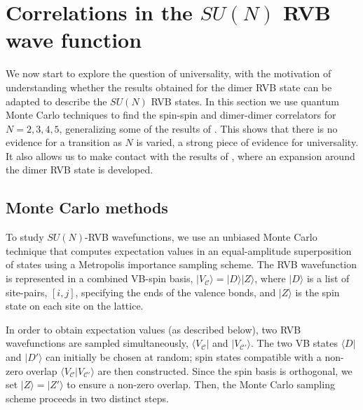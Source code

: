 \documentclass[11pt]{iopart}
\begin{document}
\section{Correlations in the $SU(N)$ RVB wave function}
\label{sec:correlations}
We now start to explore the question of universality, with the motivation of understanding whether the results obtained for the dimer RVB state can be adapted to describe the $SU(N)$ RVB states. In this section we use quantum Monte Carlo techniques to find the spin-spin and dimer-dimer correlators for $N=2,3,4,5$, generalizing some of the results of \cite{RVB1,RVB2}. This shows that there is no evidence for a transition as $N$ is varied, a strong piece of evidence for universality. It also allows us to make contact with the results of \cite{Damle}, where an expansion around the dimer RVB state is developed.


\subsection{Monte Carlo methods}
\label{sec:numerics}


To study $SU(N)$-RVB wavefunctions, we use an unbiased Monte Carlo technique that computes expectation values in an equal-amplitude superposition of states using a Metropolis importance sampling scheme.  The RVB wavefunction is represented in a combined VB-spin basis, $|V_{\mathcal C} \rangle = |D \rangle |Z \rangle$, where $| D \rangle$ is a list of site-pairs, $[i,j]$, specifying the ends of the valence bonds, and $|Z \rangle$ is the spin state on each site on the lattice.

In order to obtain expectation values (as described below), two RVB wavefunctions are sampled simultaneously, $\langle V_{\mathcal C} |$ and $| V_{\mathcal C'} \rangle$.  The two VB states $\langle D |$ and $| D' \rangle$ can initially be chosen at random; spin states compatible with a non-zero overlap $\langle V_{\mathcal C} | V_{\mathcal C'} \rangle$ are then constructed.  Since the spin basis is orthogonal, we set $|Z \rangle = | Z' \rangle$ to ensure a non-zero overlap.  Then, the Monte Carlo sampling scheme proceeds in two distinct steps.   
\end{document}
